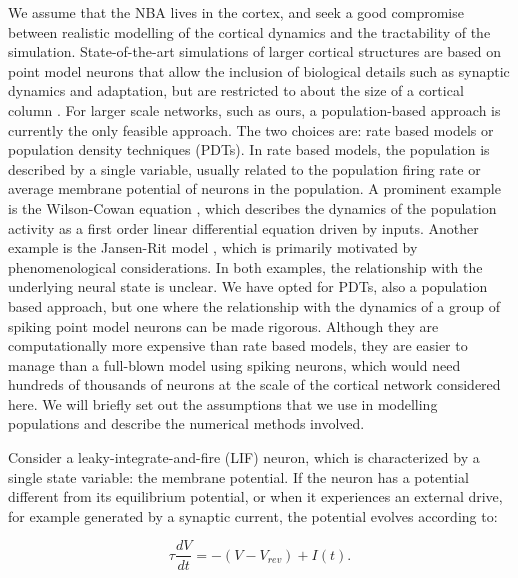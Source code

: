 \documentclass[10pt]{article}
\begin{document}
We assume that the NBA lives in the cortex, and seek a good compromise between realistic modelling of the cortical dynamics and the tractability of the simulation.
State-of-the-art simulations of larger cortical structures are based on point model neurons that allow the inclusion of biological details such as synaptic dynamics and adaptation, but are restricted to about the size of a cortical column \cite{potjans2012cell}.
For larger scale networks, such as ours, a population-based approach is currently the only feasible approach.
The two choices are: rate based models or population density techniques (PDTs).
In rate based models, the population is described by a single variable, usually related to the population firing rate or average membrane potential of neurons in the population. 
A prominent example is the  Wilson-Cowan equation \cite{wilson1972excitatory}, which describes the dynamics of the population activity as a first order linear differential equation driven by inputs.
Another example is the Jansen-Rit model \cite{jansen1995electroencephalogram}, which is primarily motivated by phenomenological considerations.
In both examples, the relationship with the underlying neural state is unclear. We have opted for PDTs, also a population based approach, but one where the relationship with the dynamics of a group of spiking point model neurons can be made rigorous.
Although they are computationally more expensive than rate based models, they are easier to manage than a full-blown model using spiking neurons, which would need hundreds of thousands of neurons at the scale of the cortical network considered here.
We will briefly set out the assumptions that we use in modelling populations and describe the numerical methods involved.

Consider a leaky-integrate-and-fire (LIF) neuron, which is characterized by a single state variable: the membrane potential.
If the neuron has a potential different from its equilibrium potential, or when it experiences an external drive, for example generated by a synaptic current, the potential evolves according to:

\begin{equation}
\tau \frac{dV}{dt} = -(V - V_{rev}) + I(t).
\label{eq-lif}
\end{equation}
\end{document}
